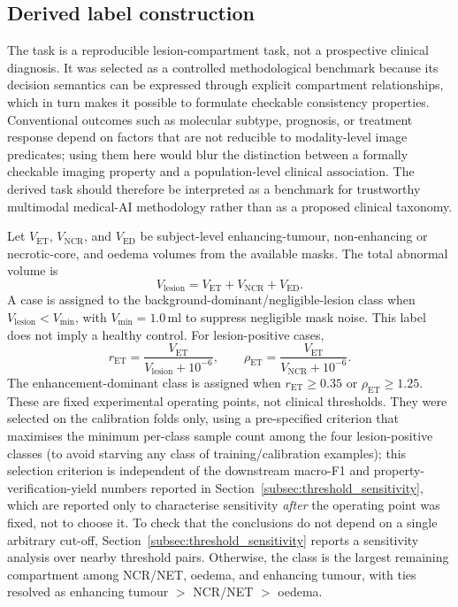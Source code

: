 \documentclass[preprint,11pt]{elsarticle}
\begin{document}
\subsection{Derived label construction}
\label{subsec:label_construction}

The task is a reproducible lesion-compartment task, not a prospective clinical diagnosis. It was selected as a controlled methodological benchmark because its decision semantics can be expressed through explicit compartment relationships, which in turn makes it possible to formulate checkable consistency properties. Conventional outcomes such as molecular subtype, prognosis, or treatment response depend on factors that are not reducible to modality-level image predicates; using them here would blur the distinction between a formally checkable imaging property and a population-level clinical association. The derived task should therefore be interpreted as a benchmark for trustworthy multimodal medical-AI methodology rather than as a proposed clinical taxonomy.

Let $V_{\mathrm{ET}}$, $V_{\mathrm{NCR}}$, and $V_{\mathrm{ED}}$ be subject-level enhancing-tumour, non-enhancing or necrotic-core, and oedema volumes from the available masks. The total abnormal volume is
\begin{equation}
V_{\mathrm{lesion}}=V_{\mathrm{ET}}+V_{\mathrm{NCR}}+V_{\mathrm{ED}}.
\end{equation}
A case is assigned to the background-dominant/negligible-lesion class when $V_{\mathrm{lesion}}<V_{\min}$, with $V_{\min}=1.0\,\mathrm{ml}$ to suppress negligible mask noise. This label does not imply a healthy control. For lesion-positive cases,
\begin{equation}
r_{\mathrm{ET}}=\frac{V_{\mathrm{ET}}}{V_{\mathrm{lesion}}+10^{-6}},\qquad
\rho_{\mathrm{ET}}=\frac{V_{\mathrm{ET}}}{V_{\mathrm{NCR}}+10^{-6}}.
\end{equation}
The enhancement-dominant class is assigned when $r_{\mathrm{ET}}\geq0.35$ or $\rho_{\mathrm{ET}}\geq1.25$. These are fixed experimental operating points, not clinical thresholds. They were selected on the calibration folds only, using a pre-specified criterion that maximises the minimum per-class sample count among the four lesion-positive classes (to avoid starving any class of training/calibration examples); this selection criterion is independent of the downstream macro-F1 and property-verification-yield numbers reported in Section~\ref{subsec:threshold_sensitivity}, which are reported only to characterise sensitivity \emph{after} the operating point was fixed, not to choose it. To check that the conclusions do not depend on a single arbitrary cut-off, Section~\ref{subsec:threshold_sensitivity} reports a sensitivity analysis over nearby threshold pairs. Otherwise, the class is the largest remaining compartment among NCR/NET, oedema, and enhancing tumour, with ties resolved as enhancing tumour $>$ NCR/NET $>$ oedema.
\end{document}
